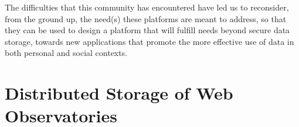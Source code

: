 \documentclass{acm_proc_article-sp}
\begin{document}

The difficulties that this community has encountered have led us to reconsider, from the ground up, the need(s) these platforms are meant to address, so that they can be used to design a platform that will fulfill needs beyond secure data storage, towards new applications that promote the more effective use of data in both personal and social contexts.





\section{Distributed Storage of Web Observatories}
\end{document}
